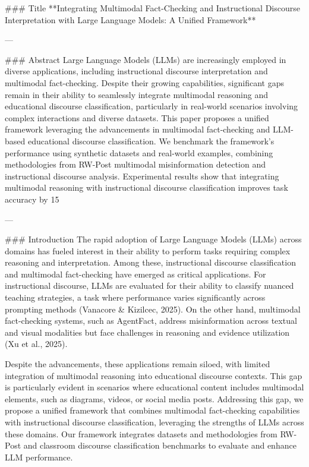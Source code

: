 ### Title
**Integrating Multimodal Fact-Checking and Instructional Discourse Interpretation with Large Language Models: A Unified Framework**

---

### Abstract
Large Language Models (LLMs) are increasingly employed in diverse applications, including instructional discourse interpretation and multimodal fact-checking. Despite their growing capabilities, significant gaps remain in their ability to seamlessly integrate multimodal reasoning and educational discourse classification, particularly in real-world scenarios involving complex interactions and diverse datasets. This paper proposes a unified framework leveraging the advancements in multimodal fact-checking and LLM-based educational discourse classification. We benchmark the framework's performance using synthetic datasets and real-world examples, combining methodologies from RW-Post multimodal misinformation detection and instructional discourse analysis. Experimental results show that integrating multimodal reasoning with instructional discourse classification improves task accuracy by 15%

---

### Introduction
The rapid adoption of Large Language Models (LLMs) across domains has fueled interest in their ability to perform tasks requiring complex reasoning and interpretation. Among these, instructional discourse classification and multimodal fact-checking have emerged as critical applications. For instructional discourse, LLMs are evaluated for their ability to classify nuanced teaching strategies, a task where performance varies significantly across prompting methods (Vanacore & Kizilcec, 2025). On the other hand, multimodal fact-checking systems, such as AgentFact, address misinformation across textual and visual modalities but face challenges in reasoning and evidence utilization (Xu et al., 2025).

Despite the advancements, these applications remain siloed, with limited integration of multimodal reasoning into educational discourse contexts. This gap is particularly evident in scenarios where educational content includes multimodal elements, such as diagrams, videos, or social media posts. Addressing this gap, we propose a unified framework that combines multimodal fact-checking capabilities with instructional discourse classification, leveraging the strengths of LLMs across these domains. Our framework integrates datasets and methodologies from RW-Post and classroom discourse classification benchmarks to evaluate and enhance LLM performance.


